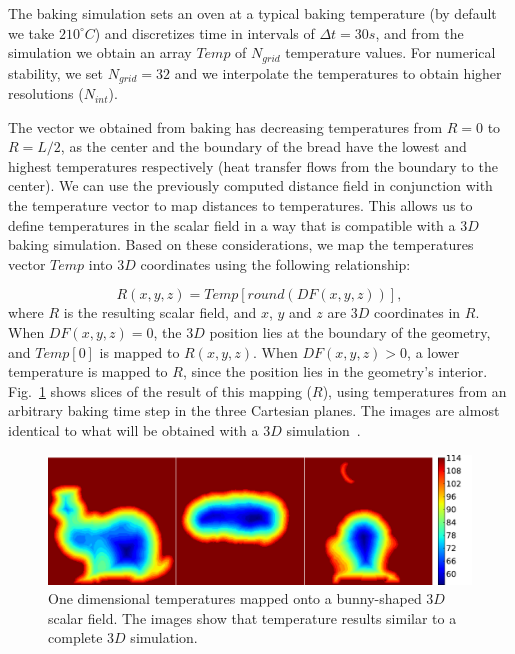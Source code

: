 \documentclass[spanish,a4paper,11pt,oneside,links]{report}
\begin{document}
The baking simulation sets an oven at a typical baking temperature (by default we take $210^{\circ}C$) and discretizes time in intervals of $\Delta t = 30s$, and from the simulation we obtain an array $Temp$ of $N_{grid}$ temperature values. 
For numerical stability, we set $N_{grid}=32$ and we interpolate the temperatures to obtain higher resolutions ($N_{int}$). 

The vector we obtained from baking has decreasing temperatures from $R = 0$ to $R = L/2$, as the center and the boundary of the bread have the lowest and highest temperatures respectively (heat transfer flows from the boundary to the center). 
We can use the previously computed distance field in conjunction with the temperature vector to map distances to temperatures. 
This allows us to define temperatures in the scalar field in a way that is compatible with a $3D$ baking simulation. Based on these considerations, we map the temperatures vector $Temp$ into $3D$ coordinates using the following relationship:

\begin{equation*}
\displaystyle R(x,y,z) = Temp[ round( DF(x,y,z) ) ], 
\end{equation*}
%
where $R$ is the resulting scalar field, and $x$, $y$ and $z$ are $3D$ coordinates in $R$. When $DF(x,y,z) = 0$, the $3D$ position lies at the boundary of the geometry, and $Temp[0]$ is mapped to $R(x,y,z)$. 
When $DF(x,y,z) > 0$, a lower temperature is mapped to $R$, since the position lies in the geometry's interior. 
Fig.~\ref{fg:baking} shows slices of the result of this mapping ($R$), using temperatures from an arbitrary baking time step in the three Cartesian planes. 
The images are almost identical to what will be obtained with a $3D$ simulation~\cite{Purlis2010}.

\begin{figure}
\includegraphics[width=19cm]{figures/tempsbunny}
\caption{One dimensional temperatures mapped onto a bunny-shaped $3D$ scalar field. The images show that temperature results similar to a complete $3D$ simulation.}
\label{fg:baking}
\end{figure}
\end{document}
